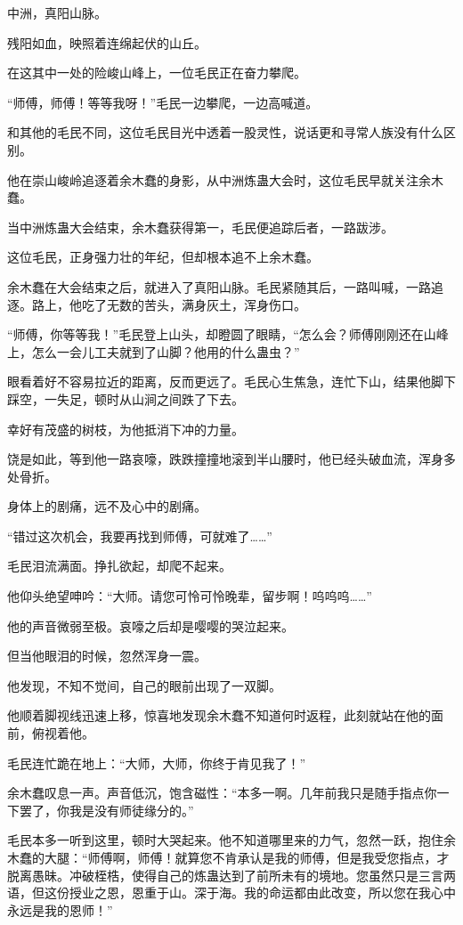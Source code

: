 
\begin{this_body}

中洲，真阳山脉。

残阳如血，映照着连绵起伏的山丘。

在这其中一处的险峻山峰上，一位毛民正在奋力攀爬。

“师傅，师傅！等等我呀！”毛民一边攀爬，一边高喊道。

和其他的毛民不同，这位毛民目光中透着一股灵性，说话更和寻常人族没有什么区别。

他在崇山峻岭追逐着余木蠢的身影，从中洲炼蛊大会时，这位毛民早就关注余木蠢。

当中洲炼蛊大会结束，余木蠢获得第一，毛民便追踪后者，一路跋涉。

这位毛民，正身强力壮的年纪，但却根本追不上余木蠢。

余木蠢在大会结束之后，就进入了真阳山脉。毛民紧随其后，一路叫喊，一路追逐。路上，他吃了无数的苦头，满身灰土，浑身伤口。

“师傅，你等等我！”毛民登上山头，却瞪圆了眼睛，“怎么会？师傅刚刚还在山峰上，怎么一会儿工夫就到了山脚？他用的什么蛊虫？”

眼看着好不容易拉近的距离，反而更远了。毛民心生焦急，连忙下山，结果他脚下踩空，一失足，顿时从山涧之间跌了下去。

幸好有茂盛的树枝，为他抵消下冲的力量。

饶是如此，等到他一路哀嚎，跌跌撞撞地滚到半山腰时，他已经头破血流，浑身多处骨折。

身体上的剧痛，远不及心中的剧痛。

“错过这次机会，我要再找到师傅，可就难了……”

毛民泪流满面。挣扎欲起，却爬不起来。

他仰头绝望呻吟：“大师。请您可怜可怜晚辈，留步啊！呜呜呜……”

他的声音微弱至极。哀嚎之后却是嘤嘤的哭泣起来。

但当他眼泪的时候，忽然浑身一震。

他发现，不知不觉间，自己的眼前出现了一双脚。

他顺着脚视线迅速上移，惊喜地发现余木蠢不知道何时返程，此刻就站在他的面前，俯视着他。

毛民连忙跪在地上：“大师，大师，你终于肯见我了！”

余木蠢叹息一声。声音低沉，饱含磁性：“本多一啊。几年前我只是随手指点你一下罢了，你我是没有师徒缘分的。”

毛民本多一听到这里，顿时大哭起来。他不知道哪里来的力气，忽然一跃，抱住余木蠢的大腿：“师傅啊，师傅！就算您不肯承认是我的师傅，但是我受您指点，才脱离愚昧。冲破桎梏，使得自己的炼蛊达到了前所未有的境地。您虽然只是三言两语，但这份授业之恩，恩重于山。深于海。我的命运都由此改变，所以您在我心中永远是我的恩师！”


\end{this_body}
